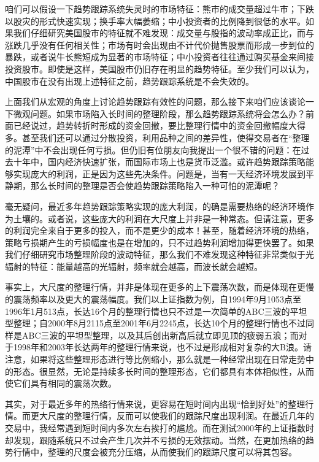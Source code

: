 咱们可以假设一下趋势跟踪系统失灵时的市场特征：熊市的成交量超过牛市；下跌以股灾的形式快速实现；换手率大幅萎缩；中小投资者的比例降到很低的水平。如果我们仔细研究美国股市的特征就不难发现：成交量与股指的波动率成正比，而与涨跌几乎没有任何相关性；市场有时会出现由不计代价抛售股票而形成一步到位的暴跌，或者说牛长熊短成为显著的市场特征；中小投资者往往通过购买基金来间接投资股市。即使是这样，美国股市仍旧存在明显的趋势特征。至少我们可以认为，中国股市在没有出现上述特征之前，趋势跟踪系统是不会失效的。

上面我们从宏观的角度上讨论趋势跟踪有效性的问题，那么接下来咱们应该谈论一下微观问题。如果市场陷入长时间的整理阶段，那么趋势跟踪系统将会怎么办？前面已经说过，趋势转折时形成的资金回撤，要比整理行情中的资金回撤幅度大得多。甚至我们还可以通过分散投资，利用品种之间的差异性，使得交易者在“整理的泥潭”中不会出现任何亏损。但仍旧有位朋友向我提出一个很不错的问题：在过去十年中，国内经济快速扩张，而国际市场上也是货币泛滥。或许趋势跟踪策略能够实现庞大的利润，正是因为这些先决条件。问题是，当有一天经济环境发展到平静期，那么长时间的整理是否会使趋势跟踪策略陷入一种可怕的泥潭呢？

毫无疑问，最近多年趋势跟踪策略实现的庞大利润，的确是需要热络的经济环境作为土壤的。或者说，这些庞大的利润在大尺度上并非是一种常态。但请注意，更多的利润完全来自于更多的投入，而不是更少的成本！甚至，随着经济环境的热络，策略亏损期产生的亏损幅度也是在增加的，只不过趋势利润增加得更快罢了。如果我们仔细研究市场整理阶段的波动特征，那么我们不难发现这种特征非常类似于光辐射的特征：能量越高的光辐射，频率就会越高，而波长就会越短。

事实上，大尺度的整理行情，并非是体现在更多的上下震荡次数，而是体现在更慢的震荡频率以及更大的震荡幅度。我们以上证指数为例，自1994年9月1053点至1996年1月513点，长达16个月的整理行情也只不过是一次简单的ABC三波的平坦型整理；自2000年8月2115点至2001年6月2245点，长达10个月的整理行情也不过同样是ABC三波的平坦型整理，以及其后创出新高后就立即见顶的疲弱五浪；而对于1998年和2003年长达两年的整理行情来说，也不过是形成相对复杂的大B浪。请注意，如果将这些整理形态进行等比例缩小，那么就是一种经常出现在日常走势中的形态。很显然，无论是持续多长时间的整理形态，它们都具有本体相似性，从而使它们具有相同的震荡次数。

其实，对于最近多年的热络行情来说，更容易在短时间内出现“恰到好处”的整理行情。而更大尺度的整理行情，反而可以使我们的跟踪尺度出现利润。在最近几年的交易中，我经常遇到短时间内多次左右挨打的尴尬。而在测试2000年的上证指数时却发现，跟随系统只不过会产生几次并不亏损的无效摆动。当然，在更加热络的趋势行情中，整理的尺度会被充分压缩，从而使我们的跟踪尺度可以将其包容。

